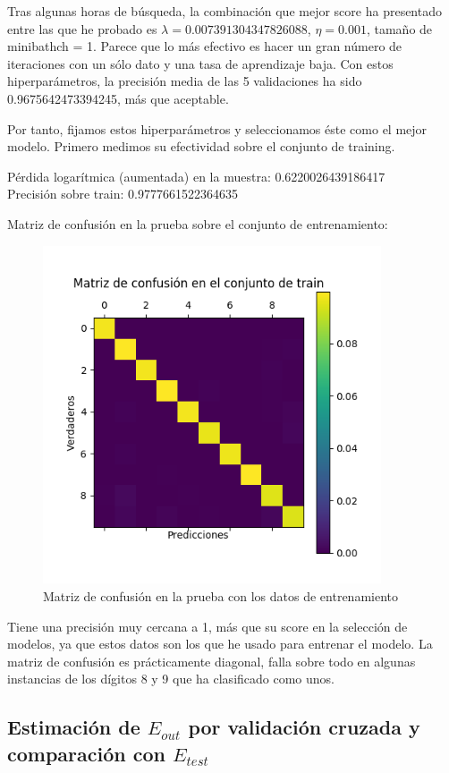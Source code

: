 \documentclass[a4]{article}
\begin{document}
Tras algunas horas de búsqueda, la combinación que mejor score ha
presentado entre las que he probado es $\lambda=0.007391304347826088$,
$\eta=0.001$, tamaño de minibathch = 1. Parece que lo más efectivo es
hacer un gran número de iteraciones con un sólo dato y una tasa de
aprendizaje baja. Con estos hiperparámetros, la precisión media de las
5 validaciones ha sido 0.9675642473394245, más que aceptable.

Por tanto, fijamos estos hiperparámetros y seleccionamos éste como el
mejor modelo. Primero medimos su efectividad sobre el conjunto de
training.

Pérdida logarítmica (aumentada) en la muestra: 0.6220026439186417 \\
Precisión sobre train: 0.9777661522364635

Matriz de confusión en la prueba sobre el conjunto de entrenamiento:
\vspace{-4mm}
\begin{figure}[H]
  \centering
  \includegraphics[width=100mm]{imgs/conf-train.png}
  \caption{Matriz de confusión en la prueba con los datos de
    entrenamiento}
  \label{fig:conf-train}
\end{figure}
\vspace{-4mm}

Tiene una precisión muy cercana a 1, más que su score en la selección
de modelos, ya que estos datos son los que he usado para entrenar el
modelo. La matriz de confusión es prácticamente diagonal, falla sobre
todo en algunas instancias de los dígitos 8 y 9 que ha clasificado
como unos.

\subsection{Estimación de $E_{out}$ por validación cruzada y
  comparación con $E_{test}$}
\end{document}
